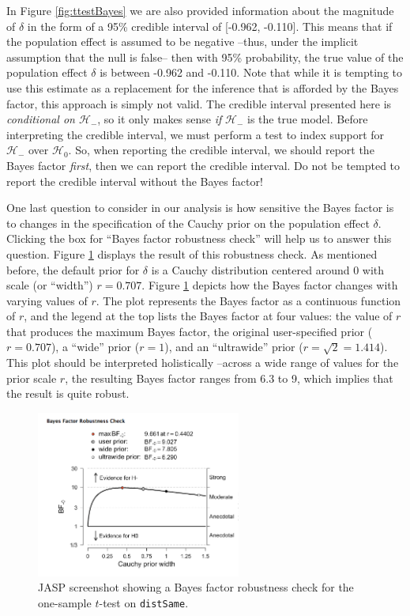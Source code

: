 \documentclass[english,,doc,floatsintext]{apa6}
\begin{document}
In Figure \ref{fig:ttestBayes} we are also provided information about the magnitude of \(\delta\) in the form of a 95\% credible interval of {[}-0.962, -0.110{]}. This means that if the population effect is assumed to be negative --thus, under the implicit assumption that the null is false-- then with 95\% probability, the true value of the population effect \(\delta\) is between -0.962 and -0.110. Note that while it is tempting to use this estimate as a replacement for the inference that is afforded by the Bayes factor, this approach is simply not valid. The credible interval presented here is \emph{conditional on \(\mathcal{H}_{-}\)}, so it only makes sense \emph{if} \(\mathcal{H}_{-}\) is the true model. Before interpreting the credible interval, we must perform a test to index support for \(\mathcal{H}_{-}\) over \(\mathcal{H}_{0}\). So, when reporting the credible interval, we should report the Bayes factor \emph{first}, then we can report the credible interval. Do not be tempted to report the credible interval without the Bayes factor!

One last question to consider in our analysis is how sensitive the Bayes factor is to changes in the specification of the Cauchy prior on the population effect \(\delta\). Clicking the box for \enquote{Bayes factor robustness check} will help us to answer this question. Figure \ref{fig:ttestRobust} displays the result of this robustness check. As mentioned before, the default prior for \(\delta\) is a Cauchy distribution centered around \(0\) with scale (or \enquote{width}) \(r=0.707\). Figure \ref{fig:ttestRobust} depicts how the Bayes factor changes with varying values of \(r\). The plot represents the Bayes factor as a continuous function of \(r\), and the legend at the top lists the Bayes factor at four values: the value of \(r\) that produces the maximum Bayes factor, the original user-specified prior (\(r=0.707\)), a \enquote{wide} prior (\(r=1\)), and an \enquote{ultrawide} prior (\(r=\sqrt{2}=1.414\)). This plot should be interpreted holistically --across a wide range of values for the prior scale \(r\), the resulting Bayes factor ranges from 6.3 to 9, which implies that the result is quite robust.

\begin{figure}
\centering
\includegraphics[width=0.6\textwidth,height=\textheight]{figures/ttestRobust.png}
\caption{\label{fig:ttestRobust}JASP screenshot showing a Bayes factor robustness check for the one-sample \(t\)-test on \texttt{distSame}.}
\end{figure}
\end{document}
